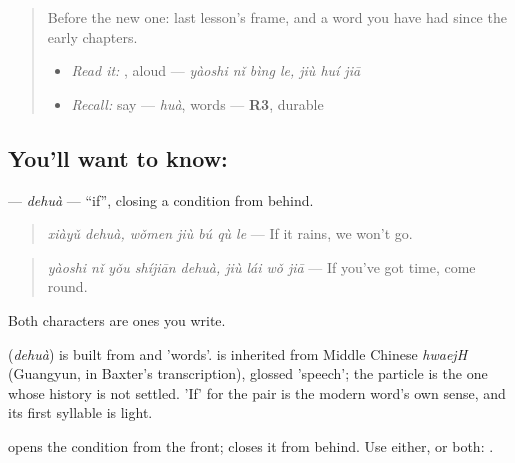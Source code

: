 \begin{quote}
Before the new one: last lesson's frame, and a word you have had since the early chapters.

\begin{itemize}
\raggedright
  \item \emph{Read it:}  , aloud — \emph{yàoshi nǐ bìng le, jiù huí jiā}
  \item \emph{Recall:} say  — \emph{huà}, words — \textbf{R3}, durable
\end{itemize}
\end{quote}

\subsection*{You'll want to know: }
\textbf{} — \emph{dehuà} — \textquotedblleft{}if\textquotedblright{}, closing a condition from behind.

\begin{quote}
\textbf{ } \emph{xiàyǔ dehuà, wǒmen jiù bú qù le} — If it rains, we won't go.
\end{quote}

\begin{quote}
\textbf{ } \emph{yàoshi nǐ yǒu shíjiān dehuà, jiù lái wǒ jiā} — If you've got time, come round.
\end{quote}

Both characters are ones you write.

\begin{cousinweb}
\textbf{} (\emph{dehuà}) is built from  and  'words'.  is inherited from Middle Chinese \emph{hwaejH} (Guangyun, in Baxter's transcription), glossed 'speech'; the particle  is the one whose history is not settled. 'If' for the pair is the modern word's own sense, and its first syllable is light.
\end{cousinweb}

\begin{grammarlens}[title={What you've built}]
 opens the condition from the front;  closes it from behind. Use either, or both: .
\end{grammarlens}


